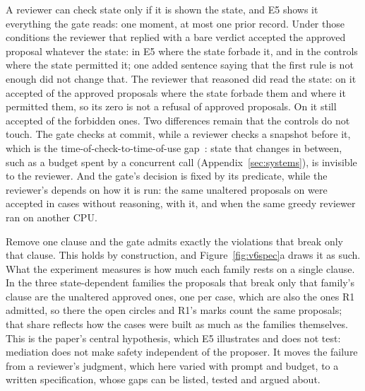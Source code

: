  A reviewer can check state only if it is shown the state, and E5 shows it everything the gate
reads: one moment, at most one prior record. Under those conditions the reviewer that replied with a bare verdict
accepted the approved proposal whatever the state: in E5 where the state forbade it, and in the controls where the
state permitted it; one added sentence saying that the first rule is not enough did not change that. The reviewer that
reasoned did read the state: on \vsixEFiveCkpt{} it accepted \vsixReasonerExact{} of the approved proposals where the
state forbade them and \vsixEFiveCTwinsPhrase{} where it permitted them, so its zero is not a refusal of approved
proposals. On \vsixOtherCkpt{} it still accepted \vsixReasonerExactOther{} of the forbidden ones. Two differences
remain that the controls do not touch. The gate checks at commit, while a reviewer checks a snapshot before it, which
is the time-of-check-to-time-of-use gap~\cite{bishop1996toctou}: state that changes in between, such as a budget spent
by a concurrent call (Appendix~\ref{sec:systems}), is invisible to the reviewer. And the gate's decision is fixed by
its predicate, while the reviewer's depends on how it is run: the same unaltered proposals on \vsixEFiveCkpt{} were
accepted in \vsixReviewerExact{} cases without reasoning, \vsixReasonerExact{} with it, and
\vsixEFiveCROneSecondHost{} when the same greedy reviewer ran on another CPU. \vsixEFiveDCostSentence

 Remove one clause and the gate admits exactly the violations that break only that
clause. This holds by construction, and Figure~\ref{fig:v6spec}a draws it as such. What the experiment measures is how
much each family rests on a single clause. In the three state-dependent families the proposals that break only that family's clause are
the unaltered approved ones, one per case, which are also the ones R1 admitted, so there the open circles and R1's
marks count the same proposals; that share reflects how the cases were built as much as the families themselves. \vsixSingleClauseSentence{} This is the paper's central hypothesis, which E5
illustrates and does not test: mediation does not make safety independent of the proposer. It moves the failure from
a reviewer's judgment, which here varied with prompt and budget, to a written specification, whose gaps can be listed,
tested and argued about.

